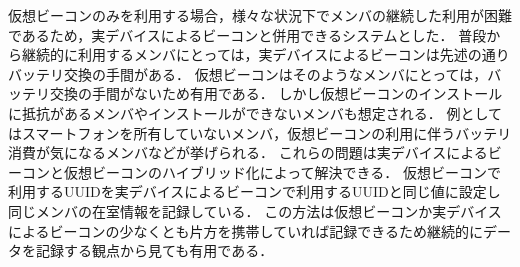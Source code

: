 仮想ビーコンのみを利用する場合，様々な状況下でメンバの継続した利用が困難であるため，実デバイスによるビーコンと併用できるシステムとした．
普段から継続的に利用するメンバにとっては，実デバイスによるビーコンは先述の通りバッテリ交換の手間がある．
仮想ビーコンはそのようなメンバにとっては，バッテリ交換の手間がないため有用である．
しかし仮想ビーコンのインストールに抵抗があるメンバやインストールができないメンバも想定される．
例としてはスマートフォンを所有していないメンバ，仮想ビーコンの利用に伴うバッテリ消費が気になるメンバなどが挙げられる．
これらの問題は実デバイスによるビーコンと仮想ビーコンのハイブリッド化によって解決できる．
仮想ビーコンで利用するUUIDを実デバイスによるビーコンで利用するUUIDと同じ値に設定し同じメンバの在室情報を記録している．
この方法は仮想ビーコンか実デバイスによるビーコンの少なくとも片方を携帯していれば記録できるため継続的にデータを記録する観点から見ても有用である．








